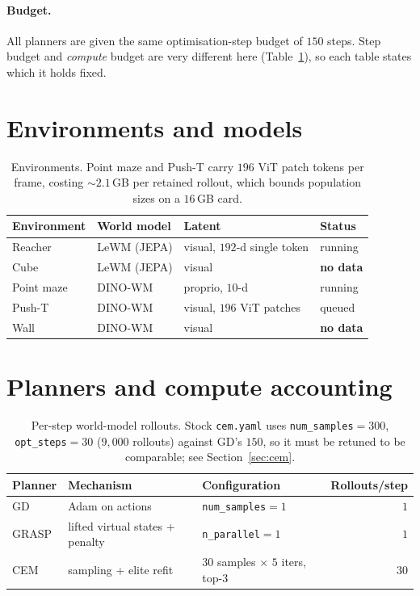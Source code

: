 \documentclass[11pt]{article}
\begin{document}
\paragraph{Budget.} All planners are given the same optimisation-step budget
of $150$ steps. Step budget and \emph{compute} budget are very different here
(Table~\ref{tab:compute}), so each table states which it holds fixed.

\section{Environments and models}

\begin{table}[h]
\centering
\begin{tabular}{llll}
\toprule
Environment & World model & Latent & Status \\
\midrule
Reacher    & LeWM (JEPA)  & visual, $192$-d single token & running \\
Cube       & LeWM (JEPA)  & visual                        & \textbf{no data} \\
Point maze & DINO-WM      & proprio, $10$-d               & running \\
Push-T     & DINO-WM      & visual, $196$ ViT patches     & queued \\
Wall       & DINO-WM      & visual                        & \textbf{no data} \\
\bottomrule
\end{tabular}
\caption{Environments. Point maze and Push-T carry $196$ ViT patch tokens per
frame, costing ${\sim}2.1$\,GB per retained rollout, which bounds population
sizes on a $16$\,GB card.}
\end{table}

\section{Planners and compute accounting}

\begin{table}[h]
\centering
\begin{tabular}{lllr}
\toprule
Planner & Mechanism & Configuration & Rollouts/step \\
\midrule
GD    & Adam on actions                & \texttt{num\_samples}$=1$                      & $1$ \\
GRASP & lifted virtual states + penalty & \texttt{n\_parallel}$=1$                       & $1$ \\
CEM   & sampling + elite refit          & $30$ samples $\times$ $5$ iters, top-$3$        & $30$ \\
\bottomrule
\end{tabular}
\caption{Per-step world-model rollouts. Stock \texttt{cem.yaml} uses
\texttt{num\_samples}$=300$, \texttt{opt\_steps}$=30$ ($9{,}000$ rollouts)
against GD's $150$, so it must be retuned to be comparable; see
Section~\ref{sec:cem}.}
\label{tab:compute}
\end{table}
\end{document}
